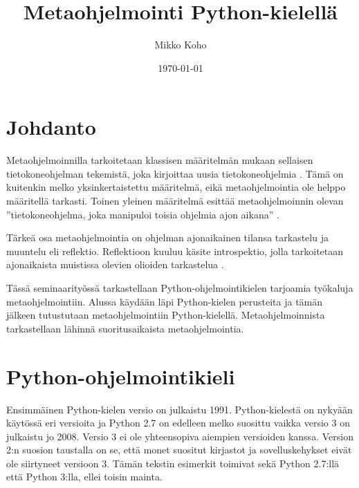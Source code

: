 \documentclass[finnish]{tktltiki2}
\title{Metaohjelmointi Python-kielellä}
\author{Mikko Koho}
\date{\today}
\theoremstyle{definition}
\theoremstyle{remark}
\begin{document}
    

\frontmatter      %

\maketitle        %

\makeabstract     %

\tableofcontents  %


\mainmatter       %


\section{Johdanto}

Metaohjelmoinnilla tarkoitetaan klassisen määritelmän mukaan sellaisen tietokoneohjelman tekemistä, joka kirjoittaa uusia tietokoneohjelmia \cite{hazzard2013}. Tämä on kuitenkin melko yksinkertaistettu määritelmä, eikä metaohjelmointia ole helppo määritellä tarkasti. Toinen yleinen määritelmä esittää metaohjelmoinnin olevan ''tietokoneohjelma, joka manipuloi toisia ohjelmia ajon aikana'' \cite{hazzard2013}. 

Tärkeä osa metaohjelmointia on ohjelman ajonaikainen tilansa tarkastelu ja muuntelu eli reflektio. Reflektioon kuuluu käsite introspektio, jolla tarkoitetaan ajonaikaista muistissa olevien olioiden tarkastelua \cite{dive-into-python}.

Tässä seminaarityössä tarkastellaan Python-ohjelmointikielen tarjoamia työkaluja metaohjelmointiin. Alussa käydään läpi Python-kielen perusteita ja tämän jälkeen tutustutaan metaohjelmointiin Python-kielellä. Metaohjelmoinnista tarkastellaan lähinnä suoritusaikaista metaohjelmointia.



\section{Python-ohjelmointikieli}

Ensimmäinen Python-kielen versio on julkaistu 1991. Python-kielestä on nykyään käytössä eri versioita ja Python 2.7 on edelleen melko suosittu vaikka versio 3 on julkaistu jo 2008. Versio 3 ei ole yhteensopiva aiempien versioiden kanssa. Version 2:n suosion taustalla on se, että monet suositut kirjastot ja sovelluskehykset eivät ole siirtyneet versioon 3. Tämän tekstin esimerkit toimivat sekä Python 2.7:llä että Python 3:lla, ellei toisin mainta.
\end{document}
